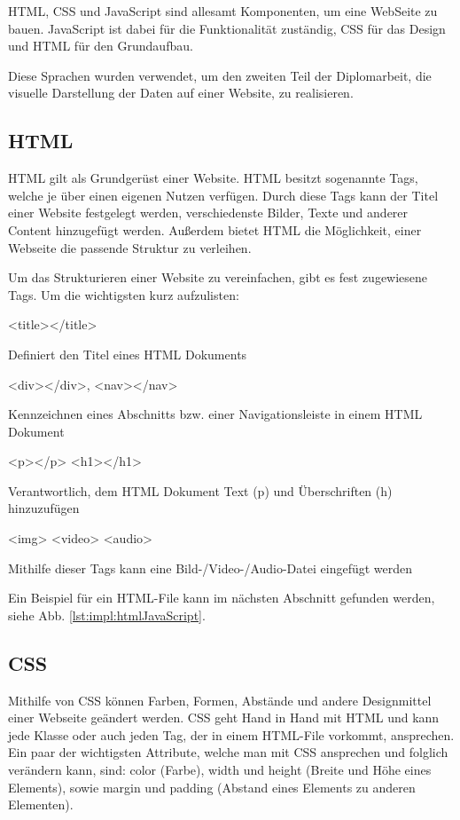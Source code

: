 HTML, CSS und JavaScript sind allesamt Komponenten, um eine WebSeite zu bauen. JavaScript ist dabei für die Funktionalität zuständig, CSS für das Design und HTML für den Grundaufbau.

Diese Sprachen wurden verwendet, um den zweiten Teil der Diplomarbeit, die visuelle Darstellung der Daten auf einer Website, zu realisieren.

\subsection{HTML}
HTML gilt als Grundgerüst einer Website. HTML besitzt sogenannte Tags, welche je über einen eigenen Nutzen verfügen. Durch diese Tags kann der Titel einer Website festgelegt werden, verschiedenste Bilder, Texte und anderer Content hinzugefügt werden. Außerdem bietet HTML die Möglichkeit, einer Webseite die passende Struktur zu verleihen. \cite{durchstartenHTML}

Um das Strukturieren einer Website zu vereinfachen, gibt es fest zugewiesene Tags. Um die wichtigsten kurz aufzulisten:
 
\begin{compactitem}
    \item [<title></title>]
    \item Definiert den Titel eines HTML Dokuments
    \item [<div></div>, <nav></nav>]
    \item Kennzeichnen eines Abschnitts bzw. einer Navigationsleiste in einem HTML Dokument
    \item [<p></p> <h1></h1>]
    \item Verantwortlich, dem HTML Dokument Text (p) und Überschriften (h) hinzuzufügen
    \item [<img> <video> <audio>]
    \item Mithilfe dieser Tags kann eine Bild-/Video-/Audio-Datei eingefügt werden
\end{compactitem}\cite{durchstartenHTML}

Ein Beispiel für ein HTML-File kann im nächsten Abschnitt gefunden werden, siehe Abb. \ref{lst:impl:htmlJavaScript}.
 
\subsection{CSS}
Mithilfe von CSS können Farben, Formen, Abstände und andere Designmittel einer Webseite geändert werden. CSS geht Hand in Hand mit HTML und kann jede Klasse oder auch jeden Tag, der in einem HTML-File vorkommt, ansprechen. Ein paar der wichtigsten Attribute, welche man mit CSS ansprechen und folglich verändern kann, sind: color (Farbe), width und height (Breite und Höhe eines Elements), sowie margin und padding (Abstand eines Elements zu anderen Elementen).
 
